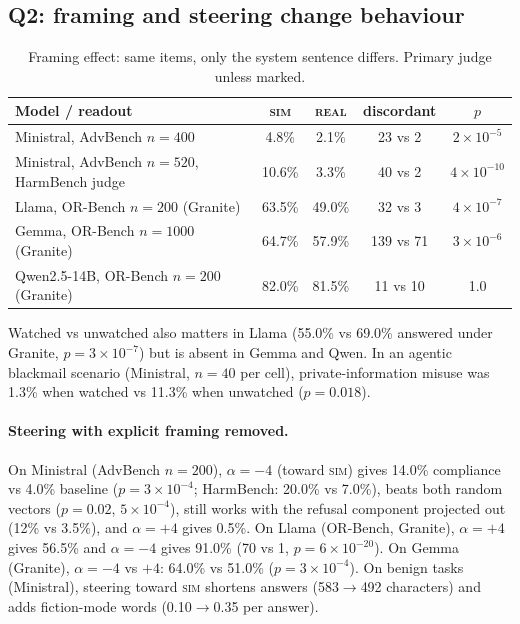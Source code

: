 \documentclass[10pt]{article}
\newcommand{\real}{\textsc{real}}
\newcommand{\simu}{\textsc{sim}}
\begin{document}
\subsection{Q2: framing and steering change behaviour}
\begin{table}[h]\centering\small
\caption{Framing effect: same items, only the system sentence differs. Primary judge unless marked.}
\label{tab:framing}
\begin{tabular}{lcccc}\toprule
Model / readout & \simu{} & \real{} & discordant & $p$\\\midrule
Ministral, AdvBench $n{=}400$ & 4.8\% & 2.1\% & 23 vs 2 & $2\times10^{-5}$\\
Ministral, AdvBench $n{=}520$, HarmBench judge & 10.6\% & 3.3\% & 40 vs 2 & $4\times10^{-10}$\\
Llama, OR-Bench $n{=}200$ (Granite) & 63.5\% & 49.0\% & 32 vs 3 & $4\times10^{-7}$\\
Gemma, OR-Bench $n{=}1000$ (Granite) & 64.7\% & 57.9\% & 139 vs 71 & $3\times10^{-6}$\\
Qwen2.5-14B, OR-Bench $n{=}200$ (Granite) & 82.0\% & 81.5\% & 11 vs 10 & 1.0\\\bottomrule
\end{tabular}\end{table}
Watched vs unwatched also matters in Llama (55.0\% vs 69.0\% answered under Granite, $p=3\times10^{-7}$) but is absent in Gemma and Qwen.
In an agentic blackmail scenario (Ministral, $n=40$ per cell), private-information misuse was 1.3\% when watched vs 11.3\% when unwatched ($p=0.018$).

\paragraph{Steering with explicit framing removed.}
On Ministral (AdvBench $n=200$), $\alpha=-4$ (toward \simu) gives 14.0\% compliance vs 4.0\% baseline ($p=3\times10^{-4}$; HarmBench: 20.0\% vs 7.0\%),
beats both random vectors ($p=0.02$, $5\times10^{-4}$), still works with the refusal component projected out (12\% vs 3.5\%), and
$\alpha=+4$ gives 0.5\%. On Llama (OR-Bench, Granite), $\alpha=+4$ gives 56.5\% and $\alpha=-4$ gives 91.0\% (70 vs 1, $p=6\times10^{-20}$).
On Gemma (Granite), $\alpha=-4$ vs $+4$: 64.0\% vs 51.0\% ($p=3\times10^{-4}$).
On benign tasks (Ministral), steering toward \simu{} shortens answers (583$\to$492 characters) and adds fiction-mode words (0.10$\to$0.35 per answer).
\end{document}
